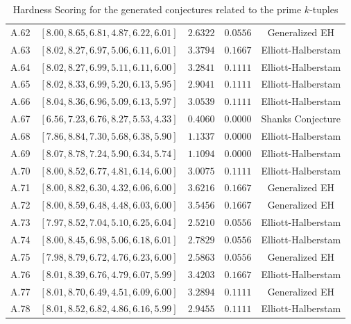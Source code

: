 \documentclass[11pt,reqno]{amsart}
\theoremstyle{plain}\newtheorem{theorem}{Theorem}[section]
\numberwithin{equation}{section}
\begin{document}
\begin{table}[ht]
\begin{center}
\begin{tabular}{|c|c|c|c|c|}
A.62  & $[8.00, 8.65, 6.81, 4.87, 6.22, 6.01]$ & $2.6322$ & $0.0556$ & Generalized EH \\
A.63  & $[8.02, 8.27, 6.97, 5.06, 6.11, 6.01]$ & $3.3794$ & $0.1667$ & Elliott-Halberstam  \\
A.64  & $[8.02, 8.27, 6.99, 5.11, 6.11, 6.00]$ & $3.2841$ & $0.1111$ & Elliott-Halberstam \\
A.65  & $[8.02, 8.33, 6.99, 5.20, 6.13, 5.95]$ & $2.9041$ & $0.1111$ & Elliott-Halberstam \\
A.66  & $[8.04, 8.36, 6.96, 5.09, 6.13, 5.97]$ & $3.0539$ & $0.1111$ & Elliott-Halberstam  \\
A.67  & $[6.56, 7.23, 6.76, 8.27, 5.53, 4.33]$ & $0.4060$ & $0.0000$ & Shanks Conjecture \\
A.68 & $[7.86, 8.84, 7.30, 5.68, 6.38, 5.90]$ & $1.1337$ & $0.0000$ & Elliott-Halberstam \\
A.69  & $[8.07, 8.78, 7.24, 5.90, 6.34, 5.74]$ & $1.1094$ & $0.0000$ & Elliott-Halberstam  \\
A.70  & $[8.00, 8.52, 6.77, 4.81, 6.14, 6.00]$ & $3.0075$ & $0.1111$ & Elliott-Halberstam  \\
A.71 & $[8.00, 8.82, 6.30, 4.32, 6.06, 6.00]$ & $3.6216$ & $0.1667$ & Generalized EH \\
A.72  & $[8.00, 8.59, 6.48, 4.48, 6.03, 6.00]$ & $3.5456$ & $0.1667$ & Generalized EH \\
A.73  & $[7.97, 8.52, 7.04, 5.10, 6.25, 6.04]$ & $2.5210$ & $0.0556$ & Elliott-Halberstam \\
A.74  & $[8.00, 8.45, 6.98, 5.06, 6.18, 6.01]$ & $2.7829$ & $0.0556$ & Elliott-Halberstam  \\
A.75  & $[7.98, 8.79, 6.72, 4.76, 6.23, 6.00]$ & $2.5863$ & $0.0556$ & Generalized EH \\
A.76  & $[8.01, 8.39, 6.76, 4.79, 6.07, 5.99]$ & $3.4203$ & $0.1667$ & Elliott-Halberstam \\
A.77  & $[8.01, 8.70, 6.49, 4.51, 6.09, 6.00]$ & $3.2894$ & $0.1111$ & Generalized EH \\
A.78  & $[8.01, 8.52, 6.82, 4.86, 6.16, 5.99]$ & $2.9455$ & $0.1111$ & Elliott-Halberstam  \\
\hline
\end{tabular}
\end{center}
\caption{Hardness Scoring for the generated conjectures related to the prime $k$-tuples}
\label{benchmarktable2}
\end{table}
\end{document}
